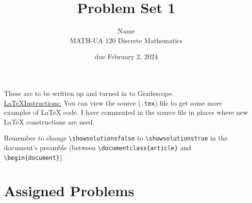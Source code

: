 \documentclass{article}
\title{Problem Set 1}
\author{%
    Name
\\  MATH-UA 120 Discrete Mathematics
}
\date{due February 2, 2024}
\newif\ifshowsolutions
\newcommand{\danger}{\marginpar[\hfill\dbend]{\dbend\hfill}}
\theoremstyle{definition}
\begin{document}
\maketitle



These are to be written up and turned in to Gradescope.\\



\ifshowsolutions
    \SetupExSheets{solution/print=true}
\else
    \danger
 \underline{ \LaTeX  Instructions:}  You can view the source (\texttt{.tex}) file to get some more examples of \LaTeX{} code.  I have commented in the source file in places where new \LaTeX{} constructions are used.
  
  Remember to change \verb|\showsolutionsfalse| to \verb|\showsolutionstrue|
    in the document's preamble 
    (between \verb|\documentclass{article}| and \verb|\begin{document}|)
\fi

\section*{Assigned Problems}
\end{document}

